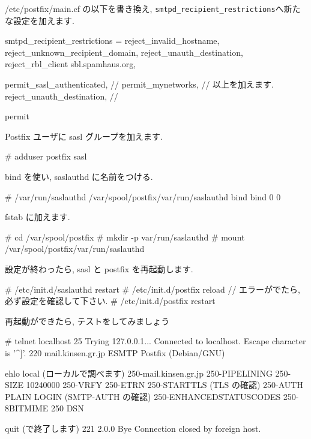 \documentclass[mingoth,a4paper]{jsarticle}
\begin{document}
/etc/postfix/main.cf の以下を書き換え, {\tt smtpd\_recipient\_restrictions}へ新たな設定を加えます.
\begin{commandline}
smtpd_recipient_restrictions = reject_invalid_hostname,
        reject_unknown_recipient_domain,
        reject_unauth_destination,
        reject_rbl_client sbl.spamhaus.org,
        
        permit_sasl_authenticated, //
        permit_mynetworks,         // 以上を加えます.
        reject_unauth_destination, //

        permit
\end{commandline}

Postfix ユーザに sasl グループを加えます.
\begin{commandline}
# adduser postfix sasl
\end{commandline}
bind を使い, saslauthd に名前をつける.
\begin{commandline}
# /var/run/saslauthd /var/spool/postfix/var/run/saslauthd bind bind 0 0
\end{commandline}
fstab に加えます.
\begin{commandline}
# cd /var/spool/postfix
# mkdir -p var/run/saslauthd
# mount /var/spool/postfix/var/run/saslauthd
\end{commandline}
設定が終わったら, sasl と postfix を再起動します.
\begin{commandline}
# /etc/init.d/saslauthd restart
# /etc/init.d/postfix reload  // エラーがでたら, 必ず設定を確認して下さい.
# /etc/init.d/postfix restart
\end{commandline}
再起動ができたら, テストをしてみましょう
\begin{commandline}
# telnet localhost 25
  Trying 127.0.0.1...
  Connected to localhost.
  Escape character is '^]'.
  220 mail.kinsen.gr.jp ESMTP Postfix (Debian/GNU)
  
  ehlo local (ローカルで調べます)
  250-mail.kinsen.gr.jp
  250-PIPELINING
  250-SIZE 10240000
  250-VRFY
  250-ETRN
  250-STARTTLS (TLS の確認)
  250-AUTH PLAIN LOGIN (SMTP-AUTH の確認)
  250-ENHANCEDSTATUSCODES
  250-8BITMIME
  250 DSN
  
  quit (で終了します)
  221 2.0.0 Bye
  Connection closed by foreign host.
\end{commandline}
\end{document}
